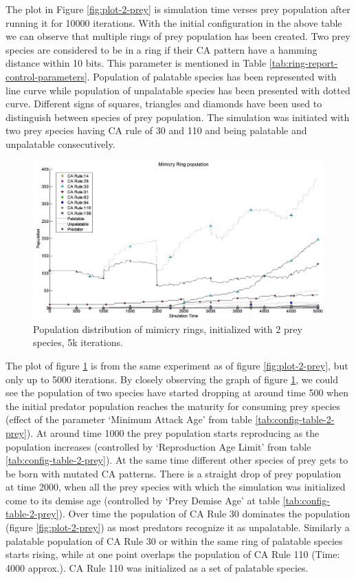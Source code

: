 The plot in Figure \ref{fig:plot-2-prey} is simulation time verses prey population after running it for 10000 iterations. With the initial configuration in the above table we can observe that multiple rings of prey population has been created. Two prey species are considered to be in a ring if their CA pattern have a hamming distance within 10 bits. This parameter is mentioned in Table \ref{tab:ring-report-control-parameters}. Population of palatable species has been represented with line curve while population of unpalatable species has been presented with dotted curve. Different signs of squares, triangles and diamonds have been used to distinguish between species of prey population. The simulation was initiated with two prey species having CA rule of 30 and 110 and being palatable and unpalatable consecutively.

\begin{figure}[H]
	\centering
	\includegraphics[scale=0.40]{images/simTime5k-2Prey}
	\caption[Population distribution of mimicry rings (2 prey species, 5k iterations)]{Population distribution of mimicry rings, initialized with 2 prey species, 5k iterations.}
	\label{fig:plot-2-prey-5k}
\end{figure}

The plot of figure \ref{fig:plot-2-prey-5k} is from the same experiment as of figure \ref{fig:plot-2-prey}, but only up to 5000 iterations. By closely observing the graph of figure \ref{fig:plot-2-prey-5k}, we could see the population of two species have started dropping at around time 500 when the initial predator population reaches the maturity for consuming prey species (effect of the parameter `Minimum Attack Age' from table \ref{tab:config-table-2-prey}). At around time 1000 the prey population starts reproducing as the population increases (controlled by `Reproduction Age Limit' from table \ref{tab:config-table-2-prey}). At the same time different other species of prey gets to be born with mutated CA patterns. There is a straight drop of prey population at time 2000, when all the prey species with which the simulation was initialized come to its demise age (controlled by `Prey Demise Age' at table \ref{tab:config-table-2-prey}). Over time the population of CA Rule 30 dominates the population (figure \ref{fig:plot-2-prey}) as most predators recognize it as unpalatable. Similarly a palatable population of CA Rule 30 or within the same ring of palatable species starts rising, while at one point overlaps the population of CA Rule 110 (Time: 4000 approx.). CA Rule 110 was initialized as a set of palatable species.

